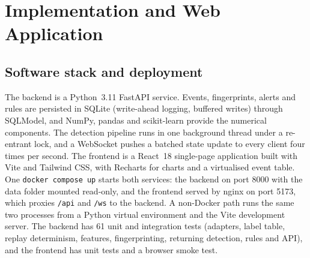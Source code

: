 \documentclass[conference]{IEEEtran}
\begin{document}
\begin{table}[t]
\centering
\caption{Rule strategy per behaviour category}
\label{tab:strategy}
\footnotesize
{}
\end{table}

\section{Implementation and Web Application}\label{sec:impl}
\subsection{Software stack and deployment}
The backend is a Python~3.11 FastAPI service. Events, fingerprints, alerts and rules are persisted in SQLite (write-ahead logging, buffered writes) through SQLModel, and NumPy, pandas and scikit-learn provide the numerical components. The detection pipeline runs in one background thread under a re-entrant lock, and a WebSocket pushes a batched state update to every client four times per second. The frontend is a React~18 single-page application built with Vite and Tailwind CSS, with Recharts for charts and a virtualised event table. One \texttt{docker compose up} starts both services: the backend on port 8000 with the data folder mounted read-only, and the frontend served by nginx on port 5173, which proxies \texttt{/api} and \texttt{/ws} to the backend. A non-Docker path runs the same two processes from a Python virtual environment and the Vite development server. The backend has 61 unit and integration tests (adapters, label table, replay determinism, features, fingerprinting, returning detection, rules and API), and the frontend has unit tests and a browser smoke test.
\end{document}
